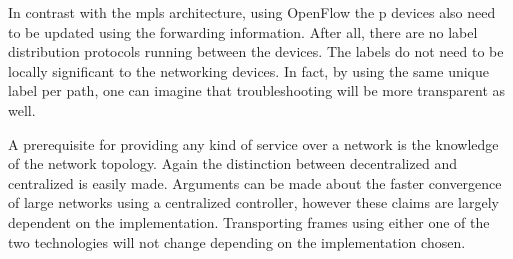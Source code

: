
In contrast with the \ac{mpls} architecture, using OpenFlow the \ac{p} devices also need to be updated using the forwarding information. After all, there are no label distribution protocols running between the devices. The labels do not need to be locally significant to the networking devices. In fact, by using the same unique label per path, one can imagine that troubleshooting will be more transparent as well.



A prerequisite for providing any kind of service over a network is the knowledge of the network topology. Again the distinction between decentralized and centralized is easily made. Arguments can be made about the faster convergence of large networks using a centralized controller, however these claims are largely dependent on the implementation. Transporting frames using either one of the two technologies will not change depending on the implementation chosen.

